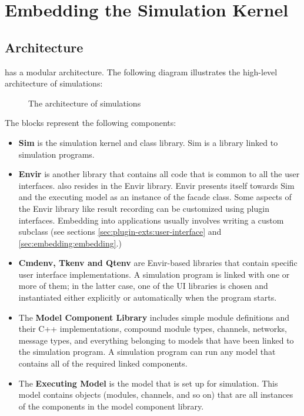 \chapter{Embedding the Simulation Kernel}
\label{cha:embedding}

\section{Architecture}
\label{sec:embedding:architecture}

{\opp} has a modular architecture. The following diagram illustrates the
high-level architecture of {\opp} simulations:

\begin{figure}[htbp]
  \begin{center}
    
    \caption{The architecture of {\opp} simulations}
  \end{center}
\end{figure}

The blocks represent the following components:

\begin{itemize}
  \item \textbf{Sim} is the simulation kernel and class
    library. Sim is a library linked to
    simulation programs.
  \item \textbf{Envir} is another library that contains all code
    that is common to all the user interfaces.  also resides
    in the Envir library. Envir presents itself towards Sim and the executing model
    as an instance of the  facade class. Some aspects of the
    Envir library like result recording can be customized
    using plugin interfaces. Embedding {\opp} into applications
    usually involves writing a custom  subclass (see sections
    \ref{sec:plugin-exts:user-interface} and \ref{sec:embedding:embedding}.)
  \item \textbf{Cmdenv, Tkenv and Qtenv} are Envir-based libraries that contain
    specific user interface implementations. A simulation program
    is linked with one or more of them; in the latter case, one of the UI libraries
    is chosen and instantiated either explicitly or automatically when the program starts.
  \item The \textbf{Model Component Library} includes simple module definitions and
    their C++ implementations, compound module types, channels, networks,
    message types, and everything belonging to models that
    have been linked to the simulation program. A simulation program can
    run any model that contains all of the required linked components.
  \item The \textbf{Executing Model} is the model that is set up
    for simulation. This model contains objects (modules, channels, and so on) that
    are all instances of the components in the model component library.
\end{itemize}

